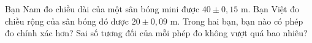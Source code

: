 \begin{ex}
Bạn Nam đo chiều dài của một sân bóng mini được $40\pm0{,}15$ m. Bạn Việt đo chiều rộng của sân bóng đó được $20\pm0{,}09$ m. Trong hai bạn, bạn nào có phép đo chính xác hơn? Sai số tương đối của mỗi phép đo không vượt quá bao nhiêu?
\end{ex}
